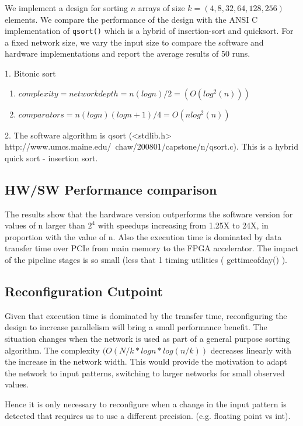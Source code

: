 We implement a design for sorting $n$ arrays of size $k = (4, 8, 32,
64, 128, 256)$ elements. We compare the performance of the design with
the ANSI C implementation of \texttt{qsort()} which is a hybrid of
insertion-sort and quicksort. For a fixed network size, we vary the
input size to compare the software and hardware implementations and
report the average results of 50 runs.



1. Bitonic sort
\begin{enumerate}
\item $complexity = network depth = n(logn)/2 =  (O(log^2(n)))  $
\item $ comparators = n (logn) (logn + 1) / 4 = O(nlog^2(n)) $
\end{enumerate}


2. The software algorithm is qsort (<stdlib.h>
http://www.umcs.maine.edu/~chaw/200801/capstone/n/qsort.c). This is a
hybrid quick sort - insertion sort.


\subsection{HW/SW Performance comparison}

The results show that the hardware version outperforms the software
version for values of n larger than $2^4$ with speedups increasing from
1.25X to 24X, in proportion with the value of n.  Also the execution
time is dominated by data transfer time over PCIe from main memory to
the FPGA accelerator. The impact of the pipeline stages is so small
(less that 1%
timing utilities ( gettimeofday() ).

\subsection{Reconfiguration Cutpoint}

Given that execution time is dominated by the transfer time,
reconfiguring the design to increase parallelism will bring a small
performance benefit.  The situation changes when the network is used
as part of a general purpose sorting algorithm. The complexity $( O(N/k
* logn * log(n/k)) $ decreases linearly with the increase in the network
width. This would provide the motivation to adapt the network to input
patterns, switching to larger networks for small observed values.

Hence it is only necessary to reconfigure when a change in the input
pattern is detected that requires us to use a different
precision. (e.g. floating point vs int).

